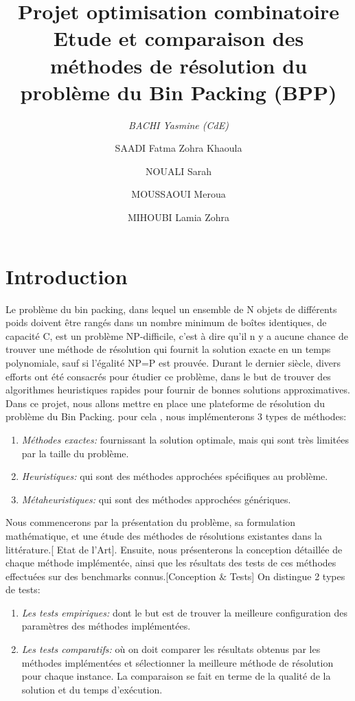 \documentclass[12pt,a4paper, titlepage]{report}
\title{Projet optimisation combinatoire\\ Etude et comparaison des méthodes de résolution du problème du Bin Packing (BPP)}
\author{ 
    \emph{BACHI Yasmine (CdE)}
    \and
    SAADI Fatma Zohra Khaoula
    \and 
    NOUALI Sarah
    \and 
    MOUSSAOUI Meroua
    \and 
    MIHOUBI Lamia Zohra}
\begin{document}
    \maketitle
    
    \tableofcontents
    \chapter*{Introduction}
      
    Le problème du bin packing, dans lequel un ensemble de N objets de différents poids doivent être rangés dans un nombre minimum de boîtes identiques, de capacité C, est un problème NP-difficile, c’est à dire qu’il n y a aucune chance de trouver une méthode de résolution qui fournit la solution exacte en un temps polynomiale, sauf si l’égalité NP=P est prouvée. 
    Durant le dernier siècle, divers efforts ont été consacrés pour étudier ce problème, dans le but de trouver des algorithmes heuristiques rapides pour fournir de bonnes solutions approximatives.
    Dans ce projet, nous allons mettre en place une plateforme de résolution du problème du Bin Packing. pour cela , nous implémenterons 3 types de méthodes: 
    \begin{enumerate}
        \item \emph{Méthodes exactes:} fournissant la solution optimale, mais qui sont très limitées par la taille du problème. 
        \item \emph{Heuristiques:} qui sont des méthodes approchées spécifiques au problème.
        \item \emph{Métaheuristiques:} qui sont des méthodes approchées génériques.
    \end{enumerate}
    Nous commencerons par la présentation du problème, sa formulation mathématique, et une étude des méthodes de résolutions existantes dans la littérature.[ Etat de l’Art]. Ensuite, nous présenterons la conception détaillée de chaque méthode implémentée, ainsi que les résultats des tests de ces méthodes effectuées sur des benchmarks connus.[Conception \& Tests]
    On distingue 2 types de tests:
    \begin{enumerate}
        \item \emph{Les tests empiriques:} dont le but est de trouver la meilleure configuration des paramètres des méthodes implémentées.  
        \item \emph{Les tests comparatifs:} où on doit comparer les résultats obtenus par les méthodes implémentées et sélectionner la meilleure méthode de résolution pour chaque instance. La comparaison se fait en terme de la qualité de la solution et du temps d'exécution. 
    \end{enumerate}
\end{document}
